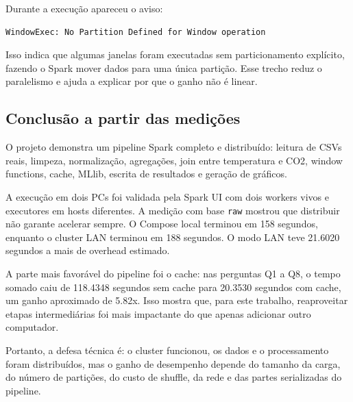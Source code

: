 \documentclass[12pt,a4paper]{article}
\begin{document}
Durante a execução apareceu o aviso:

\begin{lstlisting}
WindowExec: No Partition Defined for Window operation
\end{lstlisting}

Isso indica que algumas janelas foram executadas sem particionamento explícito, fazendo o Spark mover dados para uma única partição. Esse trecho reduz o paralelismo e ajuda a explicar por que o ganho não é linear.

\subsection{Conclusão a partir das medições}

O projeto demonstra um pipeline Spark completo e distribuído: leitura de CSVs reais, limpeza, normalização, agregações, join entre temperatura e CO2, window functions, cache, MLlib, escrita de resultados e geração de gráficos.

A execução em dois PCs foi validada pela Spark UI com dois workers vivos e executores em hosts diferentes. A medição com base \texttt{raw} mostrou que distribuir não garante acelerar sempre. O Compose local terminou em 158 segundos, enquanto o cluster LAN terminou em 188 segundos. O modo LAN teve 21.6020 segundos a mais de overhead estimado.

A parte mais favorável do pipeline foi o cache: nas perguntas Q1 a Q8, o tempo somado caiu de 118.4348 segundos sem cache para 20.3530 segundos com cache, um ganho aproximado de 5.82x. Isso mostra que, para este trabalho, reaproveitar etapas intermediárias foi mais impactante do que apenas adicionar outro computador.

Portanto, a defesa técnica é: o cluster funcionou, os dados e o processamento foram distribuídos, mas o ganho de desempenho depende do tamanho da carga, do número de partições, do custo de shuffle, da rede e das partes serializadas do pipeline.
\end{document}
